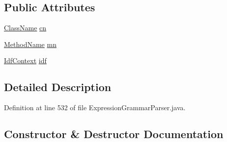 \subsection*{Public Attributes}
\begin{DoxyCompactItemize}
\item 
\hyperlink{classgov_1_1nasa_1_1jpf_1_1inspector_1_1utils_1_1expressions_1_1_class_name}{Class\+Name} \hyperlink{classgov_1_1nasa_1_1jpf_1_1inspector_1_1server_1_1expression_1_1parser_1_1_expression_grammar_parser_1_1_method_name_context_af75f2150b50379ba93a678da462770c7}{cn}
\item 
\hyperlink{classgov_1_1nasa_1_1jpf_1_1inspector_1_1utils_1_1expressions_1_1_method_name}{Method\+Name} \hyperlink{classgov_1_1nasa_1_1jpf_1_1inspector_1_1server_1_1expression_1_1parser_1_1_expression_grammar_parser_1_1_method_name_context_a99e8832dceca45330883ce8273391ffc}{mn}
\item 
\hyperlink{classgov_1_1nasa_1_1jpf_1_1inspector_1_1server_1_1expression_1_1parser_1_1_expression_grammar_parser_1_1_idf_context}{Idf\+Context} \hyperlink{classgov_1_1nasa_1_1jpf_1_1inspector_1_1server_1_1expression_1_1parser_1_1_expression_grammar_parser_1_1_method_name_context_a91ea5ce80111ff3842a3bdf08938200a}{idf}
\end{DoxyCompactItemize}


\subsection{Detailed Description}


Definition at line 532 of file Expression\+Grammar\+Parser.\+java.



\subsection{Constructor \& Destructor Documentation}
